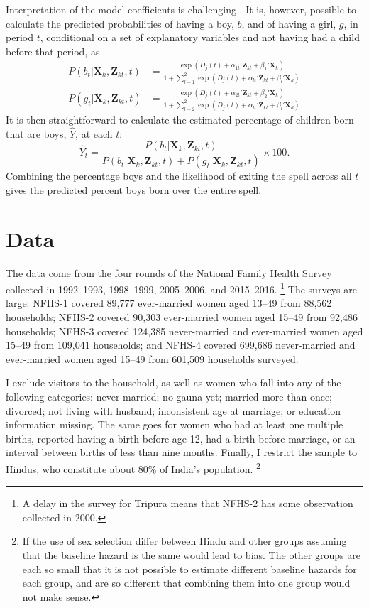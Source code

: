 \documentclass[12pt,letterpaper]{article}
\begin{document}
Interpretation of the model coefficients is challenging \citep{thomas96}.
It is, however, possible to calculate the predicted probabilities of 
having a boy, $b$, and of having a girl, $g$, in period $t$, conditional on 
a set of explanatory variables and not having had a child before that period, as
\begin{align}
P(b_{t} | \mathbf{X}_{k}, \mathbf{Z}_{kt}, t ) 
& =  
\frac{ \exp(D_j(t) + \alpha_{1t}' \mathbf{Z}_{kt} + \beta_1' \mathbf{X}_{k} )}
{1 + \sum_{l=1}^2 \exp(D_j(t) + \alpha_{lt} ' \mathbf{Z}_{kt} + \beta_l ' \mathbf{X}_{k})}
\label{eq:probability_boy} \\
P(g_{t} | \mathbf{X}_{k}, \mathbf{Z}_{kt},t ) 
& =  
\frac{ \exp(D_j(t) + \alpha_{2t}'\mathbf{Z}_{kt} + \beta_2'\mathbf{X}_{k} )}
{1 + \sum_{l=2}^2 \exp(D_j(t) + \alpha_{lt}'\mathbf{Z}_{kt} + \beta_l'\mathbf{X}_{k})}
\label{eq:probability_girl}
\end{align}
It is then straightforward to calculate the estimated percentage of children born that 
are boys, $\hat{Y}$, at each $t$:  
\begin{equation}
\hat{Y}_t 
= 
\frac{ P(b_{t} | \mathbf{X}_{k}, \mathbf{Z}_{kt},t )}
{ P(b_{t} | \mathbf{X}_{k}, \mathbf{Z}_{kt},t) + P(g_{t} | \mathbf{X}_{k}, \mathbf{Z}_{kt},t )} 
\times 100.
\label{eq:probability_son}
\end{equation}
Combining the percentage boys and the likelihood of exiting the spell 
across all $t$ gives the predicted percent boys born over the entire spell.


\section{Data\label{sec:data}}

The data come from the four rounds of the National Family Health Survey
collected in 1992--1993, 1998--1999, 2005--2006, and 2015--2016.%
\footnote{
A delay in the survey for Tripura means that NFHS-2 has some observation 
collected in 2000.
}
The surveys are large: NFHS-1 covered 89,777 ever-married women 
aged 13--49 from 88,562 households;
NFHS-2 covered 90,303 ever-married women aged 15--49 from 92,486 households;
NFHS-3 covered 124,385 never-married and ever-married women aged 
15--49 from 109,041 households;
and 
NFHS-4 covered 699,686 never-married and ever-married women aged
15--49 from 601,509 households surveyed.

I exclude visitors to the household, as well as women who fall into any of the following 
categories: never married; no gauna yet; married more than once; divorced; 
not living with husband; inconsistent age at marriage; or education information missing.  
The same goes for women who had at least one multiple births, reported having a birth 
before age 12, had a birth before marriage, or an interval between births of less than 
nine months. 
Finally, I restrict the sample to Hindus, who constitute about 80\% of India’s population.%
\footnote{
If the use of sex selection differ between Hindu and other groups assuming
that the baseline hazard is the same would lead to bias. The other
groups are each so small that it is not possible to estimate different
baseline hazards for each group, and are so different that combining
them into one group would not make sense.
} 
\end{document}
